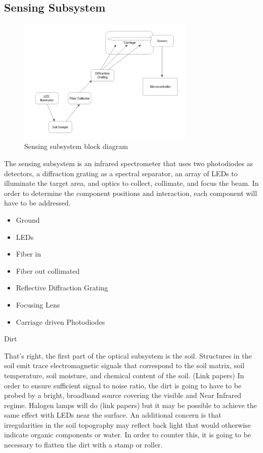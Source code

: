\subsection{Sensing Subsystem}
\begin{figure}[H]
    \caption{Sensing subsystem block diagram}
    \centering
    \includegraphics[width=0.75\textwidth]{images/OpticsBlockDiagram.png}
\end{figure}


The sensing subsystem is an infrared spectrometer that uses two photodiodes as detectors, a diffraction grating as a spectral separator, an array of LEDs to illuminate the target area, and optics to collect, collimate, and focus the beam. In order to determine the component positions and interaction, each component will have to be addressed.
    \begin{itemize}
        \item Ground
        \item LEDs
        \item Fiber in
        \item Fiber out collimated
        \item Reflective Diffraction Grating
        \item Focusing Lens
        \item Carriage driven Photodiodes
    \end{itemize}


    Dirt

That’s right, the first part of the optical subsystem is the soil. Structures in the soil emit trace electromagnetic signals that correspond to the soil matrix, soil temperature, soil moisture, and chemical content of the soil. (Link papers)
In order to ensure sufficient signal to noise ratio, the dirt is going to have to be probed by a bright, broadband source covering the visible and Near Infrared regime. Halogen lamps will do (link papers) but it may be possible to achieve the same effect with LEDs near the surface. 
An additional concern is that irregularities in the soil topography may reflect back light that would otherwise indicate organic components or water. In order to counter this, it is going to be necessary to flatten the dirt with a stamp or roller.



